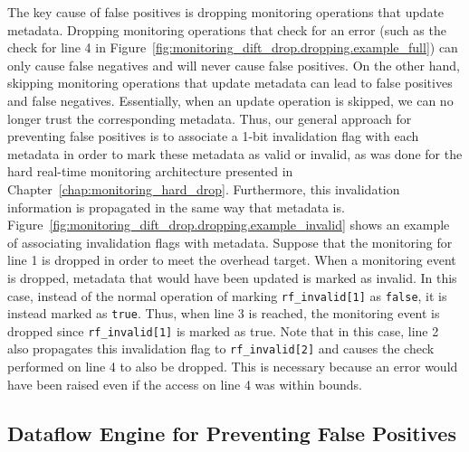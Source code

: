 The key cause of false positives is dropping monitoring operations that update
metadata. Dropping monitoring operations that check for an error (such as the
check for line 4 in
Figure~\ref{fig:monitoring_dift_drop.dropping.example_full}) can only cause
false negatives and will never cause false positives. On the other hand,
skipping monitoring operations that update metadata can lead to false positives
and false negatives.  Essentially, when an update operation is skipped, we can
no longer trust the corresponding metadata. Thus, our general approach for
preventing false positives is to associate a 1-bit invalidation flag with each
metadata in order to mark these metadata as valid or invalid, as was done for
the hard real-time monitoring architecture presented in
Chapter~\ref{chap:monitoring_hard_drop}. Furthermore, this
invalidation information is propagated in the same way that metadata is.
Figure~\ref{fig:monitoring_dift_drop.dropping.example_invalid} shows an example
of associating invalidation flags with metadata. Suppose that the monitoring
for line 1 is dropped in order to meet the overhead target. When a monitoring
event is dropped, metadata that would have been updated is marked as invalid.
In this case, instead of the normal operation of marking {\tt rf\_invalid[1]}
as {\tt false}, it is instead marked as {\tt true}. Thus, when line 3 is
reached, the monitoring event is dropped since {\tt rf\_invalid[1]} is marked
as true. Note that in this case, line 2 also propagates this invalidation flag
to {\tt rf\_invalid[2]} and causes the check performed on line 4 to also be
dropped. This is necessary because an error would have been raised even if the
access on line 4 was within bounds.

\subsection{Dataflow Engine for Preventing False Positives}
\label{sec:monitoring_dift_drop.dropping.arch}

